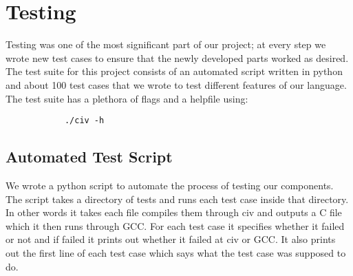 \documentclass[a4paper]{article}
\begin{document}
\section{Testing}
Testing was one of the most significant part of our project; at every step we wrote new test cases to ensure that the newly developed parts worked as desired. The test suite for this project consists of an automated script written in python and about 100 test cases that we wrote to test different features of our language. The test suite has a plethora of flags and a helpfile using:
\begin{verbatim}
            ./civ -h
\end{verbatim}

\subsection{Automated Test Script}

We wrote a python script to automate the process of testing our components. The script takes a directory of tests and runs each test case inside that directory. In other words it takes each file compiles them through civ and outputs a C file which it then runs through GCC. For each test case it specifies whether it failed or not and if failed it prints out whether it failed at civ or GCC. It also prints out the first line of each test case which says what the test case was supposed to do.
\end{document}
